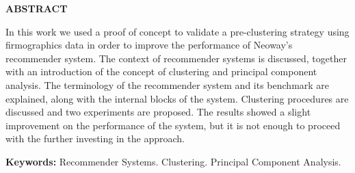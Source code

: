 \thispagestyle{plain}

\begin{center}
	\textbf{ABSTRACT}
\end{center}

\bigskip

In this work we used a proof of concept to validate a pre-clustering strategy using firmographics data in order to improve the performance of Neoway's recommender system. The context of recommender systems is discussed, together with an introduction of the concept of clustering and principal component analysis. The terminology of the recommender system and its benchmark are explained, along with the internal blocks of the system. Clustering procedures are discussed and two experiments are proposed. The results showed a slight improvement on the performance of the system, but it is not enough to proceed with the further investing in the approach.

\textbf{Keywords:} Recommender Systems. Clustering. Principal Component Analysis.